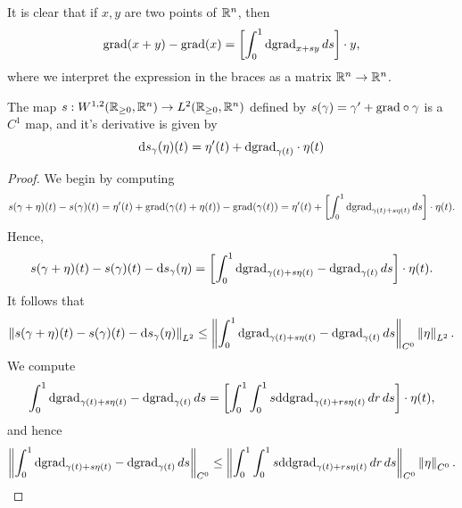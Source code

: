 It is clear that if $x,y$ are two points of $\mathbb{R}^{n}$, then
\begin{equation*}
  \mathrm{grad}(x+y)-\mathrm{grad}(x)=\left[\int_{0}^{1}\mathrm{d}\mathrm{grad}_{x+sy}\,ds\right]\cdot y,
\end{equation*}
where we interpret the expression in the braces as a matrix $\mathbb{R}^{n}\to \mathbb{R}^{n}$. 

\begin{claim}\label{claim:apr4_2}
  The map $s:W^{1,2}(\mathbb{R}_{\ge 0},\mathbb{R}^{n})\to L^{2}(\mathbb{R}_{\ge 0},\mathbb{R}^{n})$ defined by $s(\gamma)=\gamma'+\mathrm{grad}\circ \gamma$ is a $C^{1}$ map, and it's derivative is given by
  \begin{equation*}
    \mathrm{d} s_{\gamma}(\eta)(t)=\eta'(t)+\mathrm{d} \mathrm{grad}_{\gamma(t)}\cdot \eta(t)
  \end{equation*}
\end{claim}
\begin{proof}
  We begin by computing
  \begin{equation*}
    s(\gamma+\eta)(t)-s(\gamma)(t)=\eta'(t)+\mathrm{grad}(\gamma(t)+\eta(t))-\mathrm{grad}(\gamma(t))=\eta'(t)+\left[\int_{0}^{1}\mathrm{d}\mathrm{grad}_{\gamma(t)+s\eta(t)}\,ds\right]\cdot \eta(t).
  \end{equation*}
  Hence,
  \begin{equation*}
    s(\gamma+\eta)(t)-s(\gamma)(t)-\mathrm{d} s_{\gamma}(\eta)=\left[\int_{0}^{1}\mathrm{d}\mathrm{grad}_{\gamma(t)+s\eta(t)}-\mathrm{d}\mathrm{grad}_{\gamma(t)}\,d s\right]\cdot \eta(t).
  \end{equation*}
  It follows that
  \begin{equation*}
    \left\lVert s(\gamma+\eta)(t)-s(\gamma)(t)-\mathrm{d} s_{\gamma}(\eta)\right\rVert_{L^{2}}\le \left\lVert\int_{0}^{1}\mathrm{d}\mathrm{grad}_{\gamma(t)+s\eta(t)}-\mathrm{d}\mathrm{grad}_{\gamma(t)}\,d s\right\rVert_{C^{0}}\left\lVert\eta\right\rVert_{L^{2}}.
  \end{equation*}
  We compute
  \begin{equation*}
    \int_{0}^{1}\mathrm{d}\mathrm{grad}_{\gamma(t)+s\eta(t)}-\mathrm{d}\mathrm{grad}_{\gamma(t)}\,d s=\left[\int_{0}^{1}\int_{0}^{1}s\mathrm{d}\mathrm{d}\mathrm{grad}_{\gamma(t)+rs\eta(t)}\,dr\,ds \right]\cdot \eta(t),
  \end{equation*}
  and hence
  \begin{equation*}
    \norm{\int_{0}^{1}\d\grad_{\gamma(t)+s\eta(t)}-\d\grad_{\gamma(t)}\,d s}_{C^{0}}\le \norm{\int_{0}^{1}\int_{0}^{1}s\d\d\grad_{\gamma(t)+rs\eta(t)}\,dr\,ds}_{C^{0}}\norm{\eta}_{C^{0}}.

\end{equation*}
\end{proof}
